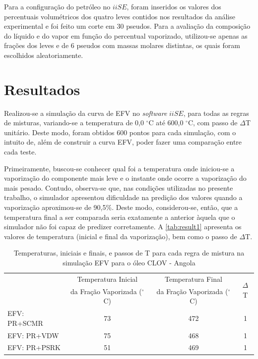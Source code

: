 Para a configuração do petróleo no $iiSE$, foram inseridos os valores dos
percentuais volumétricos dos quatro leves contidos nos resultados da análise experimental e
foi feito um corte em 30 pseudos. Para a avaliação da composição do líquido e do
vapor em função do percentual vaporizado, utilizou-se apenas as frações dos
leves e de 6 pseudos com massas molares distintas, os quais foram escolhidos
aleatoriamente.

\clearpage 

\section{Resultados} 

Realizou-se a simulação da curva de EFV no \emph{software} $iiSE$, para todas as
regras de misturas, variando-se a temperatura de 0,0 $^\circ$C até 600,0
$^\circ$C, com passo de $\Delta$T unitário. Deste modo, foram obtidos 600 pontos
para cada simulação, com o intuito de, além de construir a curva EFV, poder
fazer uma comparação entre cada teste.

Primeiramente, buscou-se conhecer qual foi a temperatura onde iniciou-se a
vaporização do componente mais leve e o instante onde ocorre a vaporização do
mais pesado. Contudo, observa-se que, nas condições utilizadas no presente
trabalho, o simulador apresentou dificuldade na predição dos valores quando a
vaporização aproximou-se de 90,5{\%}. Deste modo, considerou-se, então, que a
temperatura final a ser comparada seria exatamente a anterior àquela que o
simulador não foi capaz de predizer corretamente. A \autoref{tab:result1}
apresenta os valores de temperatura (inicial e final da vaporização), bem como o
passo de $\Delta$T.

\begin{table}[htb]
\renewcommand{\arraystretch}{1.3}
\caption{Temperaturas, iniciais e finais, e passos de T para cada regra de
mistura na simulação EFV para o óleo CLOV - Angola}
\footnotesize
\center 
\begin{tabular}{lccc}   
\toprule
   &{Temperatura Inicial}&{Temperatura Final}&\multirow{2}{*}{$\Delta$T} \\
  &{da Fração Vaporizada ($^\circ$C)}&{da Fração Vaporizada
   ($^\circ$C)} & \\
\midrule 
{EFV: PR+SCMR}	&	73	&	472		&	1 \\
{EFV: PR+VDW}	&	75	&	468		&	1 \\
{EFV: PR+PSRK}	&	51	&	469		&	1 \\
\bottomrule
\end{tabular}
\label{tab:result1}
\end{table}

